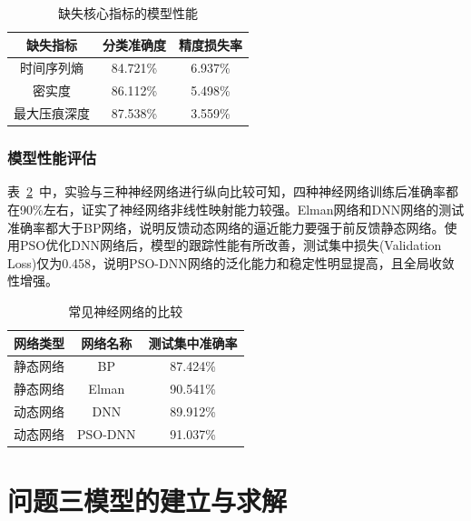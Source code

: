 \documentclass{whutmod}
\begin{document}
		\begin{table}[H]
		\centering	\caption{缺失核心指标的模型性能}\label{hengl}
		\begin{tabular}{ccc}
			\toprule[2pt]
			\multicolumn{1}{m{3cm}}{\centering 缺失指标}
			& \multicolumn{1}{m{3cm}}{\centering 分类准确度}
			&\multicolumn{1}{m{3cm}}{\centering 精度损失率}
			\\
			\midrule[1pt]
			时间序列熵	 & 84.721\%  &6.937\%  \\ 
			密实度	 &  86.112\% &5.498\%  \\ 
			最大压痕深度	 &  87.538\% &  3.559\%  \\ 
		
			\bottomrule[2pt]	
		\end{tabular}
		
	\end{table}

	\subsubsection{模型性能评估}
	表~\ref{heng}~中，实验与三种神经网络进行纵向比较可知，四种神经网络训练后准确率都在90\%左右，证实了神经网络非线性映射能力较强。Elman网络和DNN网络的测试准确率都大于BP网络，说明反馈动态网络的逼近能力要强于前反馈静态网络。使用PSO优化DNN网络后，模型的跟踪性能有所改善，测试集中损失(Validation Loss)仅为0.458，说明PSO-DNN网络的泛化能力和稳定性明显提高，且全局收敛性增强。
	
		\begin{table}[H]
	 \centering	\caption{常见神经网络的比较}\label{heng}
		\begin{tabular}{ccc}
			\toprule[2pt]
			\multicolumn{1}{m{3cm}}{\centering 网络类型}
			 & \multicolumn{1}{m{3cm}}{\centering 网络名称}
			  &\multicolumn{1}{m{4cm}}{\centering 测试集中准确率}
			  \\
			\midrule[1pt]
			静态网络	 &  BP &87.424\%  \\ 
			静态网络	 &  Elman &90.541\%  \\ 
			动态网络	 &  DNN &89.912\%  \\ 
			动态网络	 &  PSO-DNN &91.037\%  \\ 
			\bottomrule[2pt]	
		\end{tabular}

	\end{table}



	\section{问题三模型的建立与求解}
\end{document}
